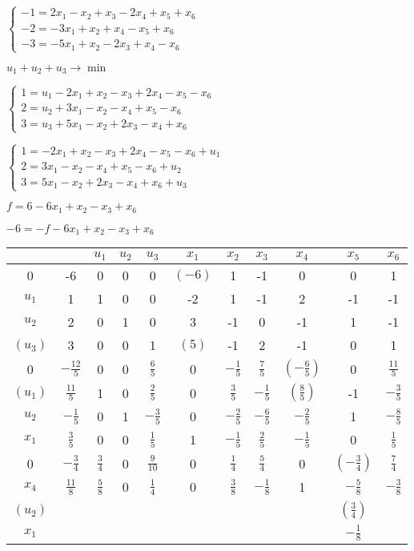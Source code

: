 \documentclass[russian]{article}
\begin{document}
$\begin{cases}
-1 = 2 x_1 - x_2 + x_3 - 2 x_4 + x_5 + x_6 \\
-2 = -3 x_1 + x_2 + x_4 - x_5 + x_6 \\
-3 = - 5 x_1 + x_2 - 2 x_3 + x_4 - x_6
\end{cases}$

$u_1 + u_2 + u_3 \to \min$

$\begin{cases}
1 =u_1 - 2 x_1 + x_2 - x_3 + 2 x_4 - x_5 - x_6\\
2 =u_2 + 3 x_1 - x_2 - x_4 + x_5 - x_6\\
3 =u_3 +  5 x_1 - x_2 + 2 x_3 - x_4 + x_6
\end{cases}$

$\begin{cases}
1 = - 2 x_1 + x_2 - x_3 + 2 x_4 - x_5 - x_6 + u_1\\
2 = 3 x_1 - x_2 - x_4 + x_5 - x_6 + u_2\\
3 = 5 x_1 - x_2 + 2 x_3 - x_4 + x_6 + u_3
\end{cases}$

$f=6 - 6 x_1 + x_2 - x_3 + x_6$

$-6=-f - 6 x_1 + x_2 - x_3 + x_6$

\begin{tabular}{|c|c|ccccccccc|} \hline
 & & $u_1$ & $u_2$ & $u_3$ & $x_1$ & $x_2$ & $x_3$ & $x_4$ & $x_5$ & $x_6$  \\\hline

0 & -6 & 0 & 0 & 0 & $(-6)$ & 1 & -1 & 0 & 0 & 1 \\
$u_1$ & 1 & 1 & 0 & 0 & -2 & 1 & -1 & 2 & -1 & -1 \\
$u_2$ & 2 & 0 & 1 & 0 & 3 & -1 & 0 & -1 & 1 & -1 \\
$(u_3)$ & 3 & 0 & 0 & 1 & $(5)$ & -1 & 2 & -1 & 0 & 1 \\\hline

0 & $-\frac{12}{5}$ & 0 & 0 & $\frac{6}{5}$ & 0 & $-\frac{1}{5}$ & $\frac{7}{5}$ & $(-\frac{6}{5})$ & 0 &  $\frac{11}{5}$ \\
$(u_1)$ & $\frac{11}{5}$ & 1 & 0 & $\frac{2}{5}$ & 0 & $\frac{3}{5}$ & $-\frac{1}{5}$ & $(\frac{8}{5})$ & -1 & $-\frac{3}{5}$ \\
$u_2$ & $-\frac{1}{5}$ & 0 & 1 & $-\frac{3}{5}$ & 0 & $-\frac{2}{5}$ & $-\frac{6}{5}$ & $-\frac{2}{5}$ & 1 & $-\frac{8}{5}$ \\
$x_1$ & $\frac{3}{5}$ & 0 & 0 & $\frac{1}{5}$ & 1 & $-\frac{1}{5}$ & $\frac{2}{5}$ & $-\frac{1}{5}$ & 0 & $\frac{1}{5}$ \\\hline

0 & $-\frac{3}{4}$ & $\frac{3}{4}$ & 0 & $\frac{9}{10}$ & 0 & $\frac{1}{4}$ & $\frac{5}{4}$ & 0 & $(-\frac{3}{4})$ & $\frac{7}{4}$ \\
$x_4$ & $\frac{11}{8}$ & $\frac{5}{8}$ & 0 & $\frac{1}{4}$ & 0 & $\frac{3}{8}$ & $-\frac{1}{8}$ & 1 & $-\frac{5}{8}$ & $-\frac{3}{8}$ \\
$(u_2)$ & & & & & & & & & $(\frac{3}{4})$ & \\
$x_1$ & & & & & & & & & $-\frac{1}{8}$ & \\\hline
\end{tabular}
\end{document}
